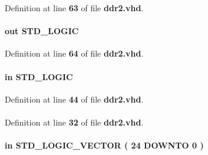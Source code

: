 Definition at line {\bf 63} of file {\bf ddr2.\+vhd}.

\paragraph[{aux\+\_\+half\+\_\+rate\+\_\+clk}]{ {\bfseries \textcolor{keywordflow}{out}\textcolor{vhdlchar}{ }} {\bfseries \textcolor{comment}{S\+T\+D\+\_\+\+L\+O\+G\+IC}\textcolor{vhdlchar}{ }} \hspace{0.3cm}{\ttfamily [Port]}}\label{classddr2_a99133d3710071e940eccba80b35be437}


Definition at line {\bf 64} of file {\bf ddr2.\+vhd}.

\paragraph[{global\+\_\+reset\+\_\+n}]{ {\bfseries \textcolor{keywordflow}{in}\textcolor{vhdlchar}{ }} {\bfseries \textcolor{comment}{S\+T\+D\+\_\+\+L\+O\+G\+IC}\textcolor{vhdlchar}{ }} \hspace{0.3cm}{\ttfamily [Port]}}\label{classddr2_af7e9fe89a5a1946a55cb9769dee37a11}


Definition at line {\bf 44} of file {\bf ddr2.\+vhd}.

\paragraph[{I\+E\+EE}]{\hspace{0.3cm}{\ttfamily [Library]}}\label{classddr2_ae4f03c286607f3181e16b9aa12d0c6d4}


Definition at line {\bf 32} of file {\bf ddr2.\+vhd}.

\paragraph[{local\+\_\+address}]{ {\bfseries \textcolor{keywordflow}{in}\textcolor{vhdlchar}{ }} {\bfseries \textcolor{comment}{S\+T\+D\+\_\+\+L\+O\+G\+I\+C\+\_\+\+V\+E\+C\+T\+OR}\textcolor{vhdlchar}{ }\textcolor{vhdlchar}{(}\textcolor{vhdlchar}{ }\textcolor{vhdlchar}{ } \textcolor{vhdldigit}{24} \textcolor{vhdlchar}{ }\textcolor{keywordflow}{D\+O\+W\+N\+TO}\textcolor{vhdlchar}{ }\textcolor{vhdlchar}{ } \textcolor{vhdldigit}{0} \textcolor{vhdlchar}{ }\textcolor{vhdlchar}{)}\textcolor{vhdlchar}{ }} \hspace{0.3cm}{\ttfamily [Port]}}\label{classddr2_af7fa8cf7a06a0be818cdb124d935ba3e}


